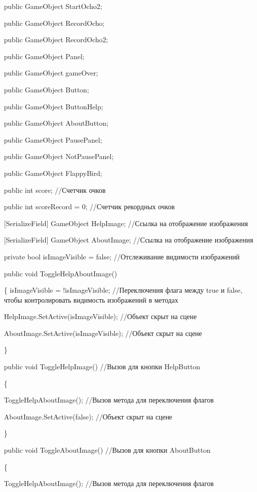 \documentclass[14pt, oneside]{altsu-report}
\begin{document}
    public GameObject StartOcho2;

    public GameObject RecordOcho;

    public GameObject RecordOcho2;

    public GameObject Panel;

    public GameObject gameOver;

    public GameObject Button;

    public GameObject ButtonHelp;

    public GameObject AboutButton;

    public GameObject PausePanel;

    public GameObject NotPausePanel;

    public GameObject FlappyBird;

    public int score; //Счетчик очков

    public int scoreRecord = 0; //Счетчик рекордных очков

    
    [SerializeField] GameObject HelpImage; //Ссылка на отображение изображения
    
    [SerializeField] GameObject AboutImage; //Ссылка на отображение изображения

    private bool isImageVisible = false; //Отслеживание видимости изображений

    public void ToggleHelpAboutImage()
    
    \{
        isImageVisible = !isImageVisible; //Переключения флага между true и false, чтобы контролировать видимость изображений в методах
        
        HelpImage.SetActive(isImageVisible); //Объект скрыт на сцене
        
        AboutImage.SetActive(isImageVisible); //Объект скрыт на сцене

    \}

    public void ToggleHelpImage() //Вызов для кнопки HelpButton
    
    \{
    
        ToggleHelpAboutImage(); //Вызов метода для переключения флагов
        
        AboutImage.SetActive(false); //Объект скрыт на сцене
        
    \}

    public void ToggleAboutImage() //Вызов для кнопки AboutButton
    
    \{
    
        ToggleHelpAboutImage(); //Вызов метода для переключения флагов
        
\end{document}
